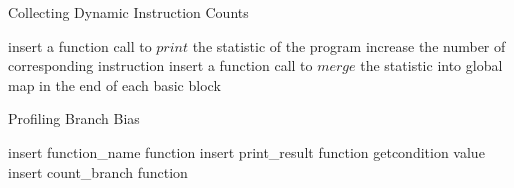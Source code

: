 \documentclass{article}
\begin{document}
\begin{algorithm}[htb]
\caption{ Collecting Dynamic Instruction Counts }
\begin{algorithmic}
                \STATE insert a function call to $print$ the statistic of the program
			\ENDIF
			\STATE increase the number of corresponding instruction
		\ENDFOR
		\STATE insert a function call to $merge$ the statistic into global map in the end of each basic block
	\ENDFOR
\ENDFOR
\end{algorithmic}
\end{algorithm}


\begin{algorithm}[htb]
\caption{ Profiling Branch Bias}
\begin{algorithmic}
        \STATE insert function\_name function
                \STATE insert print\_result function
            \ENDIF
                \STATE getcondition value
                \STATE insert count\_branch function
            \ENDIF
        \ENDFOR
    \ENDFOR
\ENDFOR

\end{algorithmic}
\end{algorithm}
\end{document}
